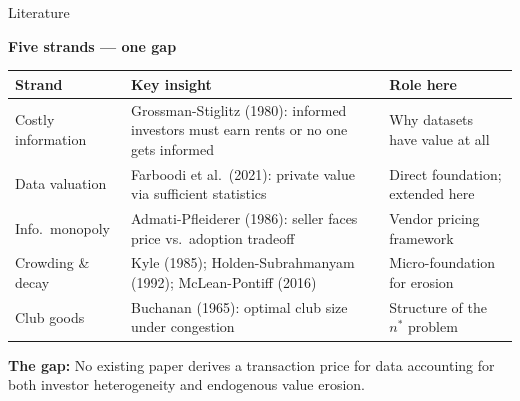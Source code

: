 \documentclass[12pt, aspectratio=169]{beamer}
\begin{document}
\begin{frame}{Literature}

\textbf{Five strands --- one gap}

\vspace{2pt}
{\footnotesize
\renewcommand{\arraystretch}{1.05}
\begin{tabular}{@{} p{2.6cm} p{5.4cm} p{4.0cm} @{}}
\toprule
\textbf{Strand} & \textbf{Key insight} & \textbf{Role here} \\
\midrule
Costly information
  & Grossman-Stiglitz (1980): informed investors must earn rents or no one gets informed
  & Why datasets have value at all \\
Data valuation
  & Farboodi et al.\ (2021): private value via sufficient statistics
  & Direct foundation; extended here \\
Info.\ monopoly
  & Admati-Pfleiderer (1986): seller faces price vs.\ adoption tradeoff
  & Vendor pricing framework \\
Crowding \& decay
  & Kyle (1985); Holden-Subrahmanyam (1992); McLean-Pontiff (2016)
  & Micro-foundation for erosion \\
Club goods
  & Buchanan (1965): optimal club size under congestion
  & Structure of the $n^*$ problem \\
\bottomrule
\end{tabular}
}

\vspace{1pt}
\textbf{The gap:} No existing paper derives a transaction price for data
accounting for both investor heterogeneity and endogenous value erosion.

\end{frame}
\end{document}

